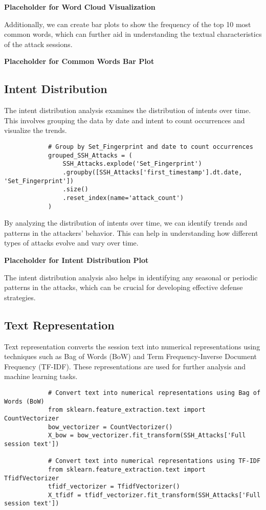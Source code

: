         \textbf{Placeholder for Word Cloud Visualization}

        Additionally, we can create bar plots to show the frequency of the top 10 most common words, which can further aid in understanding the textual characteristics of the attack sessions.

        \textbf{Placeholder for Common Words Bar Plot}

    \subsection{Intent Distribution}
            
        The intent distribution analysis examines the distribution of intents over time. This involves grouping the data by date and intent to count occurrences and visualize the trends.

        \begin{verbatim}
            # Group by Set_Fingerprint and date to count occurrences
            grouped_SSH_Attacks = (
                SSH_Attacks.explode('Set_Fingerprint')
                .groupby([SSH_Attacks['first_timestamp'].dt.date, 'Set_Fingerprint'])
                .size()
                .reset_index(name='attack_count')
            )
        \end{verbatim}

        By analyzing the distribution of intents over time, we can identify trends and patterns in the attackers' behavior. This can help in understanding how different types of attacks evolve and vary over time.

        \textbf{Placeholder for Intent Distribution Plot}

        The intent distribution analysis also helps in identifying any seasonal or periodic patterns in the attacks, which can be crucial for developing effective defense strategies.

    \subsection{Text Representation}
    
        Text representation converts the session text into numerical representations using techniques such as Bag of Words (BoW) and Term Frequency-Inverse Document Frequency (TF-IDF). These representations are used for further analysis and machine learning tasks.

        \begin{verbatim}
            # Convert text into numerical representations using Bag of Words (BoW)
            from sklearn.feature_extraction.text import CountVectorizer
            bow_vectorizer = CountVectorizer()
            X_bow = bow_vectorizer.fit_transform(SSH_Attacks['Full session text'])

            # Convert text into numerical representations using TF-IDF
            from sklearn.feature_extraction.text import TfidfVectorizer
            tfidf_vectorizer = TfidfVectorizer()
            X_tfidf = tfidf_vectorizer.fit_transform(SSH_Attacks['Full session text'])
        \end{verbatim}

